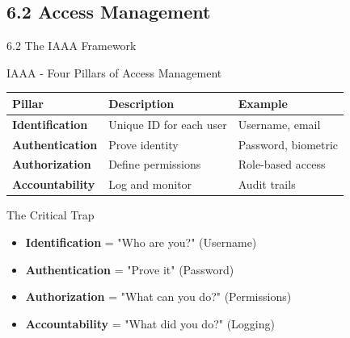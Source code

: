 \documentclass{beamer}
\begin{document}
	\subsection{6.2 Access Management}
	\begin{frame}{6.2 The IAAA Framework}
		\begin{block}{IAAA - Four Pillars of Access Management}
			\begin{tabular}{|p{2.5cm}|p{4cm}|p{4.5cm}|}
				\hline
				\textbf{Pillar} & \textbf{Description} & \textbf{Example} \\
				\hline
				\textbf{Identification} & Unique ID for each user & Username, email \\
				\hline
				\textbf{Authentication} & Prove identity & Password, biometric \\
				\hline
				\textbf{Authorization} & Define permissions & Role-based access \\
				\hline
				\textbf{Accountability} & Log and monitor & Audit trails \\
				\hline
			\end{tabular}
		\end{block}
		
		\begin{alertblock}{The Critical Trap}
			\begin{itemize}
				\item \textbf{Identification} = "Who are you?" (Username)
				\item \textbf{Authentication} = "Prove it" (Password)
				\item \textbf{Authorization} = "What can you do?" (Permissions)
				\item \textbf{Accountability} = "What did you do?" (Logging)
			\end{itemize}
		\end{alertblock}
	\end{frame}
	
\end{document}
